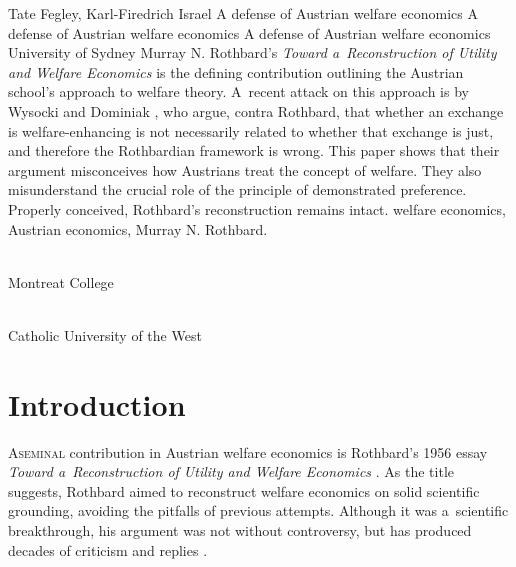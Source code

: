 \begin{artengenv2auth}{Tate Fegley, Karl-Firedrich Israel}
	{A defense of Austrian welfare economics}
		{A defense of Austrian welfare economics}
		{A defense of Austrian welfare economics}
	{University of Sydney}
	{Murray N. Rothbard's \textit{Toward a~Reconstruction of Utility and Welfare Economics} is the defining contribution outlining the Austrian school's approach to welfare theory. A~recent attack on this approach is by Wysocki and Dominiak 
	\parencite*[][]{wysocki_how_2023}, %
	 who argue, contra Rothbard, that whether an exchange is welfare-enhancing is not necessarily related to whether that exchange is just, and therefore the Rothbardian framework is wrong. This paper shows that their argument misconceives how Austrians treat the concept of welfare. They also misunderstand the crucial role of the principle of demonstrated preference. Properly conceived, Rothbard's reconstruction remains intact.
		}
		{welfare economics, Austrian economics, Murray N. Rothbard.}
	{%
		{\flushright{}\\\subsubsectit\small{Montreat College}\par}%
		{\flushright{}\\\subsubsectit\small{Catholic University of the West}\par}%
	}




\section{Introduction}

\lettrine[loversize=0.13,lines=2,lraise=-0.03,nindent=0em,findent=0.2pt]%
{A}{seminal} %
contribution in Austrian welfare economics is Rothbard's 1956 essay \textit{Toward a~Reconstruction of Utility and Welfare Economics} 
\parencite[][]{rothbard_toward_2011}. %
 As the title suggests, Rothbard aimed to reconstruct welfare economics on solid scientific grounding, avoiding the pitfalls of previous attempts. Although it was a~scientific breakthrough, his argument was not without controversy, but has produced decades of criticism and replies 
\parencites[][]{block_austrian_1999}[][]{caplan_austrian_1999}[][]{cordato_welfare_1992}[][]{gordon_toward_1993}[][]{herbener_pareto_1997}[][]{herbener_defense_2008}[][]{hulsmann_economic_1999}[][]{kvasnicka_rothbards_2008}[][]{prychitko_formalism_1993}.%





\end{artengenv2auth}
